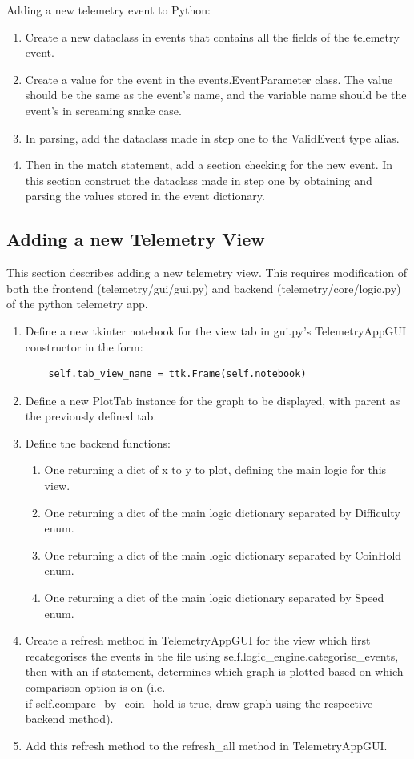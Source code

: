 \documentclass[11pt]{article}
\begin{document}
Adding a new telemetry event to Python:
\begin{enumerate}
  \item Create a new dataclass in events that contains all the fields of the telemetry event.
  \item Create a value for the event in the events.EventParameter class. The value should be the same as the event's name, and the variable name should be the event's in screaming snake case. 
  \item In parsing, add the dataclass made in step one to the ValidEvent type alias. 
  \item Then in the match statement, add a section checking for the new event. In this section construct the dataclass made in step one by obtaining and parsing the values stored in the event dictionary.
\end{enumerate}

\subsection{Adding a new Telemetry View}
This section describes adding a new telemetry view. This requires modification of both the frontend (telemetry/gui/gui.py) and backend (telemetry/core/logic.py) of the python telemetry app.
\begin{enumerate}
  \item Define a new tkinter notebook for the view tab in gui.py's TelemetryAppGUI constructor in the form:
  \begin{verbatim}
    self.tab_view_name = ttk.Frame(self.notebook)
  \end{verbatim}
  \item Define a new PlotTab instance for the graph to be displayed, with parent as the previously defined tab.
  \item Define the backend functions:
  \begin{enumerate}
    \item One returning a dict of x to y to plot, defining the main logic for this view. 
    \item One returning a dict of the main logic dictionary separated by Difficulty enum.
    \item One returning a dict of the main logic dictionary separated by CoinHold enum. 
    \item One returning a dict of the main logic dictionary separated by Speed enum.
  \end{enumerate}
  \item Create a refresh method in TelemetryAppGUI for the view which first recategorises the events in the file using self.logic\_engine.categorise\_events, then with an if statement, determines which graph is plotted based on which comparison option is on (i.e. \\if self.compare\_by\_coin\_hold is true, draw graph using the respective backend method).
  \item Add this refresh method to the refresh\_all method in TelemetryAppGUI.
\end{enumerate}
\end{document}
